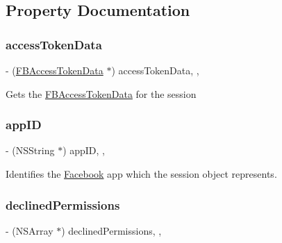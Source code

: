 \subsection{Property Documentation}
\mbox{\label{interfaceFBSession_a77d239a0dfeab500070b81d829c01805}} 
\subsubsection{\texorpdfstring{access\+Token\+Data}{accessTokenData}}
{\footnotesize\ttfamily -\/ (\hyperlink{interfaceFBAccessTokenData}{F\+B\+Access\+Token\+Data} $\ast$) access\+Token\+Data\hspace{0.3cm}{\ttfamily [read]}, {\ttfamily [atomic]}, {\ttfamily [copy]}}

Gets the \hyperlink{interfaceFBAccessTokenData}{F\+B\+Access\+Token\+Data} for the session \mbox{\label{interfaceFBSession_ad6c53ffa2d041dec94a79bdfcb30aafe}} 
\subsubsection{\texorpdfstring{app\+ID}{appID}}
{\footnotesize\ttfamily -\/ (N\+S\+String $\ast$) app\+ID\hspace{0.3cm}{\ttfamily [read]}, {\ttfamily [atomic]}, {\ttfamily [copy]}}

Identifies the \hyperlink{interfaceFacebook}{Facebook} app which the session object represents. \mbox{\label{interfaceFBSession_adbc87bbf09697c6f40b3394b2432016d}} 
\subsubsection{\texorpdfstring{declined\+Permissions}{declinedPermissions}}
{\footnotesize\ttfamily -\/ (N\+S\+Array $\ast$) declined\+Permissions\hspace{0.3cm}{\ttfamily [read]}, {\ttfamily [atomic]}, {\ttfamily [copy]}}

